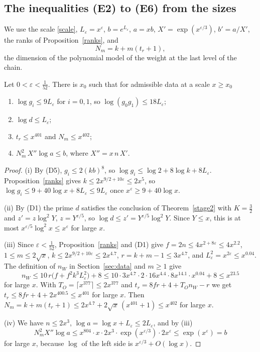 \subsection{The inequalities (E2) to (E6) from the sizes}\label{r5:sec:Hsizes}

We use the scale \eqref{scale}, $L_\varepsilon=x^\varepsilon$, $b=e^{L_\varepsilon}$, $a=xb$, $X'=\exp(x^{\varepsilon/3})$, $b'=a/X'$, the ranks of Proposition~\ref{ranks}, and
\[
N_m=k+m(t_r+1),
\]
the dimension of the polynomial model of the weight at the last level of the chain.

\begin{lemma}\label{r5:lem:primesizes}
Let $0<\varepsilon<\frac1{52}$. There is $x_0$ such that for admissible data at a scale $x\ge x_0$
\begin{enumerate}
\item[(i)] $\log g_i\le9L_\varepsilon$ for $i=0,1$, so $\log(g_0g_1)\le18L_\varepsilon$;
\item[(ii)] $\log d\le L_\varepsilon$;
\item[(iii)] $t_r\le x^{401}$ and $N_m\le x^{402}$;
\item[(iv)] $N_m^2\,X''\log a\le b$, where $X''=x\,n\,X'$.
\end{enumerate}
\end{lemma}

\begin{proof}
(i) By (D5), $g_i\le2(kb)^8$, so $\log g_i\le\log2+8\log k+8L_\varepsilon$. Proposition~\ref{ranks} gives $k\le2x^{9/2+10\varepsilon}\le2x^5$, so $\log g_i\le9+40\log x+8L_\varepsilon\le9L_\varepsilon$ once $x^\varepsilon\ge9+40\log x$.

(ii) By (D1) the prime $d$ satisfies the conclusion of Theorem~\ref{stage2} with $K=\frac32$ and $z'=z\log^2Y$, $z=Y^{\varepsilon/5}$, so $\log d\le z'=Y^{\varepsilon/5}\log^2Y$. Since $Y\le x$, this is at most $x^{\varepsilon/5}\log^2x\le x^\varepsilon$ for large $x$.

(iii) Since $\varepsilon<\frac1{52}$, Proposition~\ref{ranks} and (D1) give $f=2n\le4x^{2+8\varepsilon}\le4x^{2.2}$, $1\le m\le2\sqrt x$, $k\le2x^{9/2+10\varepsilon}\le2x^{4.7}$, $r=k+m-1\le3x^{4.7}$, and $L_\varepsilon^2=x^{2\varepsilon}\le x^{0.04}$. The definition of $n_W$ in Section~\ref{sec:data} and $m\ge1$ give
\[
n_W\le10\,r\big(f+f^2k^3L_\varepsilon^2\big)+8\le10\cdot3x^{4.7}\cdot2\cdot16x^{4.4}\cdot8x^{14.1}\cdot x^{0.04}+8\le x^{23.5}
\]
for large $x$. With $T_O=\lceil x^{377}\rceil\le2x^{377}$ and $t_r=8fr+4+T_On_W-r$ we get $t_r\le8fr+4+2x^{400.5}\le x^{401}$ for large $x$. Then $N_m=k+m(t_r+1)\le2x^{4.7}+2\sqrt x\,(x^{401}+1)\le x^{402}$ for large $x$.

(iv) We have $n\le2x^{3}$, $\log a=\log x+L_\varepsilon\le2L_\varepsilon$, and by (iii)
\[
N_m^2X''\log a\le x^{804}\cdot x\cdot2x^3\cdot\exp(x^{\varepsilon/3})\cdot2x^\varepsilon\le\exp(x^\varepsilon)=b
\]
for large $x$, because $\log$ of the left side is $x^{\varepsilon/3}+O(\log x)$.
\end{proof}


